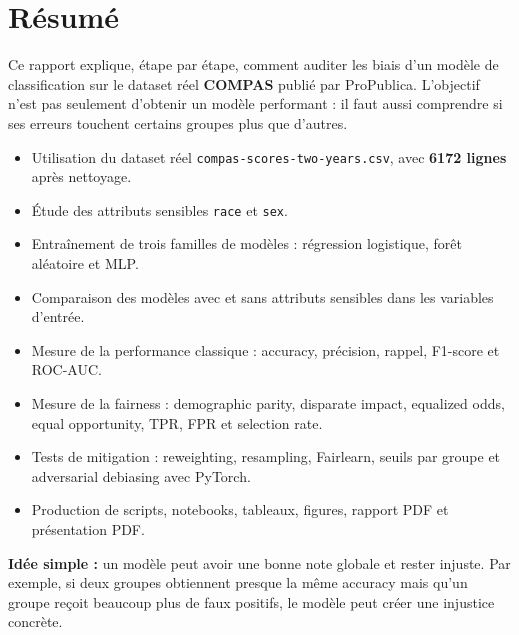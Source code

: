 \documentclass[12pt,a4paper]{report}
\begin{document}
\chapter*{Résumé}
\thispagestyle{fancy}

\begin{tcolorbox}[summarybox]
\large
Ce rapport explique, étape par étape, comment auditer les biais d'un modèle de classification sur le dataset réel \textbf{COMPAS} publié par ProPublica. L'objectif n'est pas seulement d'obtenir un modèle performant : il faut aussi comprendre si ses erreurs touchent certains groupes plus que d'autres.
\end{tcolorbox}

\vspace{0.8em}

\begin{tcolorbox}[successbox, title={Ce qui a été réalisé}]
\begin{itemize}
  \item Utilisation du dataset réel \texttt{compas-scores-two-years.csv}, avec \textbf{6172 lignes} après nettoyage.
  \item Étude des attributs sensibles \texttt{race} et \texttt{sex}.
  \item Entraînement de trois familles de modèles : régression logistique, forêt aléatoire et MLP.
  \item Comparaison des modèles avec et sans attributs sensibles dans les variables d'entrée.
  \item Mesure de la performance classique : accuracy, précision, rappel, F1-score et ROC-AUC.
  \item Mesure de la fairness : demographic parity, disparate impact, equalized odds, equal opportunity, TPR, FPR et selection rate.
  \item Tests de mitigation : reweighting, resampling, Fairlearn, seuils par groupe et adversarial debiasing avec PyTorch.
  \item Production de scripts, notebooks, tableaux, figures, rapport PDF et présentation PDF.
\end{itemize}
\end{tcolorbox}

\begin{tcolorbox}[infobox]
\textbf{Idée simple :} un modèle peut avoir une bonne note globale et rester injuste. Par exemple, si deux groupes obtiennent presque la même accuracy mais qu'un groupe reçoit beaucoup plus de faux positifs, le modèle peut créer une injustice concrète.
\end{tcolorbox}
\end{document}
